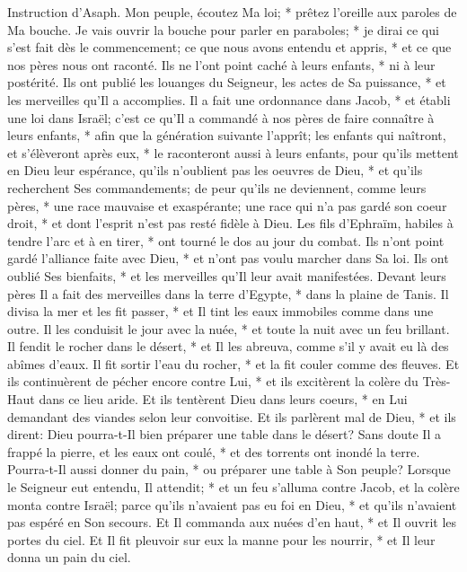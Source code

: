 Instruction d'Asaph. Mon peuple, écoutez Ma loi; * prêtez l'oreille aux paroles de Ma bouche.
Je vais ouvrir la bouche pour parler en paraboles; * je dirai ce qui s'est fait dès le commencement;
ce que nous avons entendu et appris, * et ce que nos pères nous ont raconté.
Ils ne l'ont point caché à leurs enfants, * ni à leur postérité. Ils ont publié les louanges du Seigneur, les actes de Sa puissance, * et les merveilles qu'Il a accomplies.
Il a fait une ordonnance dans Jacob, * et établi une loi dans Israël; c'est ce qu'Il a commandé à nos pères de faire connaître à leurs enfants, *
afin que la génération suivante l'apprît; les enfants qui naîtront, et s'élèveront après eux, * le raconteront aussi à leurs enfants,
pour qu'ils mettent en Dieu leur espérance, qu'ils n'oublient pas les oeuvres de Dieu, * et qu'ils recherchent Ses commandements;
de peur qu'ils ne deviennent, comme leurs pères, * une race mauvaise et exaspérante; une race qui n'a pas gardé son coeur droit, * et dont l'esprit n'est pas resté fidèle à Dieu.
Les fils d'Ephraïm, habiles à tendre l'arc et à en tirer, * ont tourné le dos au jour du combat.
Ils n'ont point gardé l'alliance faite avec Dieu, * et n'ont pas voulu marcher dans Sa loi.
Ils ont oublié Ses bienfaits, * et les merveilles qu'Il leur avait manifestées.
Devant leurs pères Il a fait des merveilles dans la terre d'Egypte, * dans la plaine de Tanis.
Il divisa la mer et les fit passer, * et Il tint les eaux immobiles comme dans une outre.
Il les conduisit le jour avec la nuée, * et toute la nuit avec un feu brillant.
Il fendit le rocher dans le désert, * et Il les abreuva, comme s'il y avait eu là des abîmes d'eaux.
Il fit sortir l'eau du rocher, * et la fit couler comme des fleuves.
Et ils continuèrent de pécher encore contre Lui, * et ils excitèrent la colère du Très-Haut dans ce lieu aride.
Et ils tentèrent Dieu dans leurs coeurs, * en Lui demandant des viandes selon leur convoitise.
Et ils parlèrent mal de Dieu, * et ils dirent: Dieu pourra-t-Il bien préparer une table dans le désert?
Sans doute Il a frappé la pierre, et les eaux ont coulé, * et des torrents ont inondé la terre. Pourra-t-Il aussi donner du pain, * ou préparer une table à Son peuple?
Lorsque le Seigneur eut entendu, Il attendit; * et un feu s'alluma contre Jacob, et la colère monta contre Israël;
parce qu'ils n'avaient pas eu foi en Dieu, * et qu'ils n'avaient pas espéré en Son secours.
Et Il commanda aux nuées d'en haut, * et Il ouvrit les portes du ciel.
Et Il fit pleuvoir sur eux la manne pour les nourrir, * et Il leur donna un pain du ciel.
